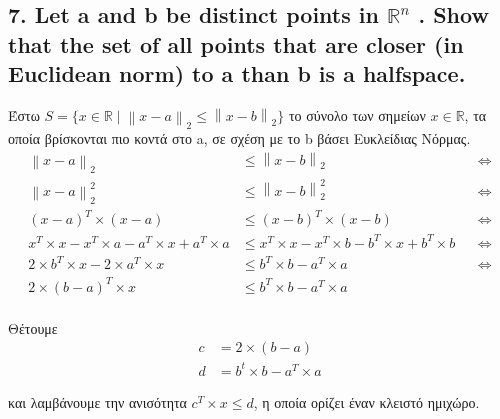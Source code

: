 \documentclass[12pt]{article}
\newcommand{\R}{\mathbb{R}}
\newcommand{\norm}[1]{\left\lVert#1\right\rVert}
\begin{document}
\vspace{2in} %

\subsection*{7. Let a and b be distinct points in $\mathbb{R}^n$ . Show that the set of all points that are closer (in
Euclidean norm) to a than b is a halfspace.}

Έστω $S = \lbrace x \in \R \mid \norm{x - a}_2 \leq \norm{x - b}_2 \rbrace$ το σύνολο
των σημείων $x \in \R$, τα οποία βρίσκονται πιο κοντά στο a, σε σχέση με το b
βάσει Ευκλείδιας Νόρμας.\\

\begin{align*}
    \norm{x - a}_2 & \leq \norm{x - b}_2 && \Leftrightarrow \\    
    \norm{x - a}_2^2 & \leq \norm{x - b}_2^2 && \Leftrightarrow \\    
    (x - a)^T \times (x - a) & \leq (x - b)^T \times (x - b) && \Leftrightarrow \\
    x^T \times x - x^T \times a - a^T \times x + a^T \times a & \leq x^T \times x - x^T \times b - b^T \times x + b^T \times b && \Leftrightarrow \\
    2 \times b^T \times x - 2 \times a^T \times x & \leq b^T \times b - a^T \times a && \Leftrightarrow \\
    2 \times (b - a)^T \times x & \leq b^T \times b - a^T \times a
\end{align*}\\

Θέτουμε\\

\begin{align*}
    c & = 2 \times (b - a) \\
    d & = b^t \times b - a^T \times a
\end{align*}

και λαμβάνουμε την ανισότητα $c^T \times x \leq d$, η οποία ορίζει έναν κλειστό ημιχώρο.
\end{document}
